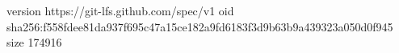 version https://git-lfs.github.com/spec/v1
oid sha256:f558fdee81da937f695c47a15ce182a9fd6183f3d9b63b9a439323a050d0f945
size 174916
